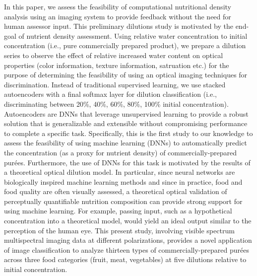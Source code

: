 \documentclass[authoryear]{elsarticle}
\begin{document}
In this paper, we assess the feasibility of computational nutritional density analysis using an imaging system to provide feedback without the need for human assessor input. This preliminary dilutions study is motivated by the end-goal of nutrient density assessment. Using relative water concentration to initial concentration (i.e., pure commercially prepared product), we prepare a dilution series to observe the effect of relative increased water content on optical properties (color information, texture information, satruation etc.) for the purpose of determining the feasibility of using an optical imaging techniques for discrimination. Instead of traditional supervised learning, we use stacked autoencoders with a final softmax layer for dilution classification (i.e., discriminating between 20\%, 40\%, 60\%, 80\%, 100\% initial concentration). Autoencoders are DNNs that leverage unsupervised learning to provide a robust solution that is generalizable and extensible without compromising performance to complete a specific task. Specifically, this is the first study to our knowledge to assess the feasibility of using machine learning (DNNs) to automatically predict the concentration (as a proxy for nutrient density) of  commercially-prepared pur\' ees. Furthermore, the use of DNNs for this task is motivated by the results of a theoretical optical dilution model. In particular, since neural networks are biologically inspired machine learning methods and since in practice, food and food quality are often visually assessed, a theoretical optical validation of perceptually quantifiable nutrition composition can provide strong support for using machine learning. For example, passing input, such as a hypothetical concentration into a theoretical model, would yield an ideal output similar to the perception of the human eye. This present study, involving visible spectrum multispectral imaging data at different polarizations, provides a novel application of image classification to analyze thirteen types of commercially-prepared pur\' ees across three food categories (fruit, meat, vegetables) at five dilutions relative to initial concentration.
\end{document}
